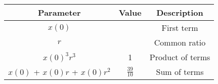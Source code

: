 \begin{tabular}{|c|c|c|}
        \hline
        \textbf{Parameter} & \textbf{Value} & \textbf{Description} \\
        \hline
        $x(0)$ & & First term \\
        \hline
        $r$ & & Common ratio \\
        \hline
        $x(0)^3r^3$ & 1 & Product of terms \\
        \hline
        $x(0)$ + $x(0)r$ + $x(0)r^2$ & $\frac{39}{10}$ & Sum of terms \\
        \hline
    \end{tabular}
